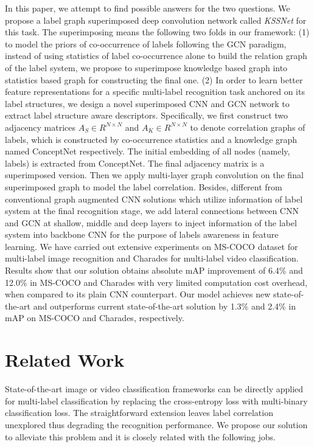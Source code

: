 \documentclass[letterpaper]{article} \usepackage{aaai20}  \usepackage{times}  \usepackage{helvet} \usepackage{courier}  \usepackage[hyphens]{url}  \usepackage{graphicx} \usepackage{subfigure}
\begin{document}
In this paper, we attempt to find possible answers for the two questions. We propose a label graph superimposed deep convolution network called \emph{KSSNet} for this task. The superimposing means the following two folds in our framework: (1) to model the priors of co-occurrence of labels following the GCN paradigm, instead of using statistics of label co-occurrence alone to build the relation graph of the label system, we propose to superimpose knowledge based graph into statistics based graph for constructing the final one. (2) In order to learn better feature representations for a specific multi-label recognition task anchored on its label structures, we design a novel superimposed CNN and GCN network to extract label structure aware descriptors. Specifically, we first construct two adjacency matrices $A_S\in R^{N\times N}$ and $A_K\in R^{N\times N}$ to denote correlation graphs of labels, which is constructed by co-occurrence statistics and a knowledge graph named ConceptNet \cite{speer2017conceptnet} respectively. The initial embedding of all nodes (namely, labels) is extracted from ConceptNet. The final adjacency matrix is a superimposed version. Then we apply multi-layer graph convolution on the final superimposed graph to model the label correlation. Besides, different from conventional graph augmented CNN solutions which utilize information of label system at the final recognition stage, we add lateral connections between CNN and GCN at shallow, middle and deep layers to inject information of the label system into backbone CNN for the purpose of labels awareness in feature learning. We have carried out extensive experiments on MS-COCO dataset \cite{Lin2014Microsoft} for multi-label image recognition and Charades \cite{Sigurdsson2016Hollywood} for multi-label video classification. Results show that our solution obtains absolute mAP improvement of 6.4\% and 12.0\% in MS-COCO and Charades with very limited computation cost overhead, when compared to its plain CNN counterpart. Our model achieves new state-of-the-art and outperforms current state-of-the-art solution by 1.3\% and 2.4\% in mAP on MS-COCO and Charades, respectively. 



\section{Related Work}
State-of-the-art image or video classification frameworks \cite{resnet,carreira2017quo,feichtenhofer2018slowfast,stnet,wu2019long} can be directly applied for multi-label classification by replacing the cross-entropy loss with multi-binary classification loss. The straightforward extension leaves label correlation unexplored thus degrading the recognition performance. We propose our solution to alleviate this problem and it is closely related with the following jobs.
\end{document}
